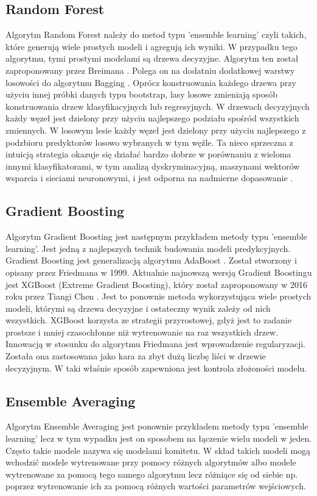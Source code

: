 \subsection{Random Forest}
Algorytm Random Forest należy do metod typu 'ensemble learning' czyli takich, które generują wiele prostych modeli i agregują ich wyniki. W przypadku tego algorytmu, tymi prostymi modelami są drzewa decyzyjne. Algorytm ten został zaproponowany przez Breimana \cite{random_forest}. Polega on na dodatniu dodatkowej warstwy losowości do algorytmu Bagging \cite{bagging}. Oprócz konstruowania każdego drzewa przy użyciu innej próbki danych typu bootstrap, lasy losowe zmieniają sposób konstruowania drzew klasyfikacyjnych lub regresyjnych. W drzewach decyzyjnych każdy węzeł jest dzielony przy użyciu najlepszego podziału spośród wszystkich zmiennych. W losowym lesie każdy węzeł jest dzielony przy użyciu najlepszego z podzbioru predyktorów losowo wybranych w tym węźle. Ta nieco sprzeczna z intuicją strategia okazuje się działać bardzo dobrze w porównaniu z wieloma innymi klasyfikatorami, w tym analizą dyskryminacyjną, maszynami wektorów wsparcia i sieciami neuronowymi, i jest odporna na nadmierne dopasowanie \cite{random_forest}. 

\subsection{Gradient Boosting}
Algorytm Gradient Boosting jest następnym przykładem metody typu 'ensemble learning'. Jest jedną z najlepszych technik budowania modeli predykcyjnych. Gradient Boosting jest generalizacją algorytmu AdaBoost \cite{adaboost}. Został stworzony i opisany przez Friedmana \cite{gradient_boosting} w 1999. Aktualnie najnowszą wersją Gradient Boostingu jest XGBoost (Extreme Gradient Boosting), który został zaproponowany w 2016 roku przez Tiangi Chen \cite{xgboost}. Jest to ponownie metoda wykorzystująca wiele prostych modeli, którymi są drzewa decyzyjne i ostateczny wynik zależy od nich wszystkich. XGBoost korzysta ze strategii przyrostowej, gdyż jest to zadanie prostsze i mniej czasochłonne niż wytrenowanie na raz wszystkich drzew. Innowacją w stosunku do algorytmu Friedmana jest wprowadzenie regularyzacji. Została ona zastosowana jako kara za zbyt dużą liczbę liści w drzewie decyzyjnym. W taki właśnie sposób zapewniona jest kontrola złożoności modelu. 

\subsection{Ensemble Averaging}
Algorytm Ensemble Averaging \cite{ensemble_averaging} jest ponownie przykładem metody typu 'ensemble learning' lecz w tym wypadku jest on sposobem na łączenie wielu modeli w jeden. Często takie modele nazywa się modelami komitetu. W skład takich modeli mogą wchodzić modele wytrenowane przy pomocy różnych algorytmów albo modele wytrenowane za pomocą tego samego algorytmu lecz różniące się od siebie np.  poprzez wytrenowanie ich za pomocą różnych wartości parametrów wejściowych.

